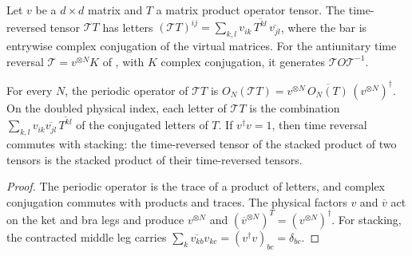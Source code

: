 \begin{definition}
    \label{def:mpug_time_reversed_tensor}
    \leanok
    Let $v$ be a $d\times d$ matrix and $T$ a matrix product operator tensor.
    The time-reversed tensor $\mathcal T T$ has letters
    $(\mathcal T T)^{ij}=\sum_{k,l}v_{ik}\,\overline{T^{kl}}\,\overline{v_{jl}}$,
    where the bar is entrywise complex conjugation of the virtual matrices.
    For the antiunitary time reversal $\mathcal T=v^{\otimes N}K$ of
    \cite[Section~4.3]{GarreRubio2023MPOSym}, with $K$ complex conjugation,
    it generates $\mathcal T O\mathcal T^{-1}$.
\end{definition}

\begin{lemma}
    \label{lem:mpug_time_reversed_tensor_properties}
    \leanok
    For every $N$, the periodic operator of $\mathcal T T$ is
    $O_N(\mathcal T T)=v^{\otimes N}\,\overline{O_N(T)}\,(v^{\otimes N})^\dagger$.
    On the doubled physical index, each letter of $\mathcal T T$ is the
    combination $\sum_{k,l}v_{ik}\overline{v_{jl}}\,\overline{T^{kl}}$ of the
    conjugated letters of $T$. If $v^\dagger v=1$, then time reversal
    commutes with stacking: the time-reversed tensor of the stacked product
    of two tensors is the stacked product of their time-reversed tensors.
\end{lemma}

\begin{proof}
    \leanok
    The periodic operator is the trace of a product of letters, and complex
    conjugation commutes with products and traces. The physical factors
    $v$ and $\overline v$ act on the ket and bra legs and produce
    $v^{\otimes N}$ and $(\overline v^{\otimes N})^T=(v^{\otimes N})^\dagger$.
    For stacking, the contracted middle leg carries
    $\sum_k\overline{v_{kb}}v_{kc}=(v^\dagger v)_{bc}=\delta_{bc}$.
\end{proof}


